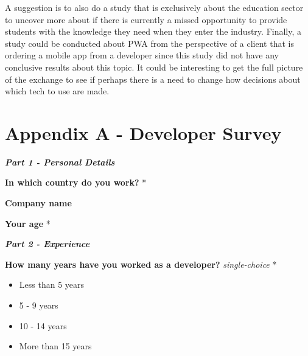 \documentclass[a4paper,12pt]{article}
\renewcommand{\arraystretch}{1.5}
\begin{document}
A suggestion is to also do a study that is exclusively about the education sector to uncover more about if there is currently a missed opportunity to provide students with the knowledge they need when they enter the industry. 
Finally, a study could be conducted about PWA from the perspective of a client that is ordering a mobile app from a developer since this study did not have any conclusive results about this topic. It could be interesting to get the full picture of the exchange to see if perhaps there is a need to change how decisions about which tech to use are made.

\newpage
\hypersetup{urlcolor=black}
%
%
\printbibliography[heading=bibintoc]

\newpage
\setcounter{page}{1} %
\appendix

\setlength{\parindent}{0pt}
\setlength{\arrayrulewidth}{0.3mm}
\setlength{\tabcolsep}{4pt}
\renewcommand{\arraystretch}{1.5}

\section{Appendix A - Developer Survey} 
\label{Appendix_devSurvey}

\textbf{\textit{Part 1 - Personal Details}}

\textbf{In which country do you work?} *

\quad

\textbf{Company name}

\quad

\textbf{Your age} *

\quad

\quad

\textbf{\textit{Part 2 - Experience}}

\textbf{How many years have you worked as a developer?} \textit{single-choice} *
\begin{itemize}
    \item Less than 5 years
    \item 5 - 9 years
    \item 10 - 14 years
    \item More than 15 years
\end{itemize}
\end{document}
